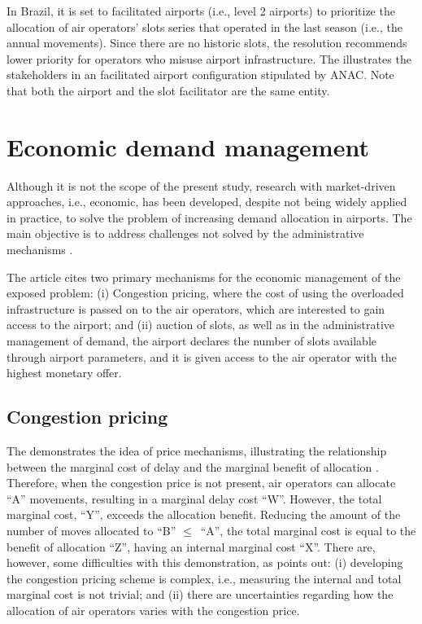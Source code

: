  In Brazil, it is set to facilitated airports (i.e., level 2 airports) to prioritize the allocation of air operators’ slots series that operated in the last season (i.e., the annual movements). Since there are no historic slots, the resolution recommends lower priority for operators who misuse airport infrastructure. The  illustrates the stakeholders in an facilitated airport configuration stipulated by \acrshort{ANAC}. Note that both the airport and the slot facilitator are the same entity.


 \section{Economic demand management}
Although it is not the scope of the present study, research with market-driven approaches, i.e., economic, has been developed, despite not being widely applied in practice, to solve the problem of increasing demand allocation in airports. The main objective is to address challenges not solved by the administrative mechanisms \cite{ball2006auctions}.

The article \cite{gillen2016airport} cites two primary mechanisms for the economic management of the exposed problem: (i) Congestion pricing, where the cost of using the overloaded infrastructure is passed on to the air operators, which are interested to gain access to the airport; and (ii) auction of slots, as well as in the administrative management of demand, the airport declares the number of slots available through airport parameters, and it is given access to the air operator with the highest monetary offer.

\subsection{Congestion pricing}

The  demonstrates the idea of price mechanisms, illustrating the relationship between the marginal cost of delay and the marginal benefit of allocation \cite{gillen2016airport}. Therefore, when the congestion price is not present, air operators can allocate “A” movements, resulting in a marginal delay cost “W”. However, the total marginal cost, “Y”, exceeds the allocation benefit. Reducing the amount of the number of moves allocated to “B” $\le$\ “A”, the total marginal cost is equal to the benefit of allocation “Z”, having an internal marginal cost “X”. There are, however, some difficulties with this demonstration, as \cite{gillen2016airport} points out: (i) developing the congestion pricing scheme is complex, i.e., measuring the internal and total marginal cost is not trivial; and (ii) there are uncertainties regarding how the allocation of air operators varies with the congestion price.

